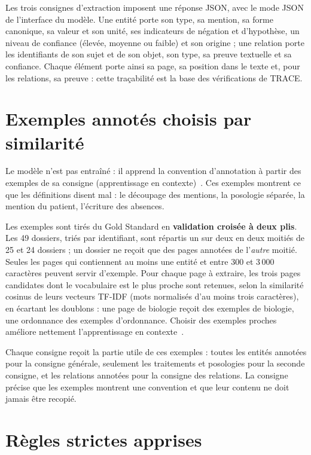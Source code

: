 Les trois consignes d'extraction imposent une réponse JSON, avec le mode JSON de l'interface du modèle. Une entité porte son type, sa mention, sa forme canonique, sa valeur et son unité, ses indicateurs de négation et d'hypothèse, un niveau de confiance (élevée, moyenne ou faible) et son origine ; une relation porte les identifiants de son sujet et de son objet, son type, sa preuve textuelle et sa confiance. Chaque élément porte ainsi sa page, sa position dans le texte et, pour les relations, sa preuve : cette traçabilité est la base des vérifications de TRACE.

\section{Exemples annotés choisis par similarité}\label{sec:c4-exemples}

Le modèle n'est pas entraîné : il apprend la convention d'annotation à partir des exemples de sa consigne (apprentissage en contexte)~\cite{agrawal2022fewshot}. Ces exemples montrent ce que les définitions disent mal : le découpage des mentions, la posologie séparée, la mention du patient, l'écriture des absences.

Les exemples sont tirés du Gold Standard en \textbf{validation croisée à deux plis}. Les 49 dossiers, triés par identifiant, sont répartis un sur deux en deux moitiés de 25 et 24 dossiers ; un dossier ne reçoit que des pages annotées de l'\emph{autre} moitié. Seules les pages qui contiennent au moins une entité et entre 300 et 3\,000 caractères peuvent servir d'exemple. Pour chaque page à extraire, les trois pages candidates dont le vocabulaire est le plus proche sont retenues, selon la similarité cosinus de leurs vecteurs TF-IDF (mots normalisés d'au moins trois caractères), en écartant les doublons : une page de biologie reçoit des exemples de biologie, une ordonnance des exemples d'ordonnance. Choisir des exemples proches améliore nettement l'apprentissage en contexte~\cite{liu2022incontext}.

Chaque consigne reçoit la partie utile de ces exemples : toutes les entités annotées pour la consigne générale, seulement les traitements et posologies pour la seconde consigne, et les relations annotées pour la consigne des relations. La consigne précise que les exemples montrent une convention et que leur contenu ne doit jamais être recopié.

\section{Règles strictes apprises}\label{sec:c4-regles-strictes}

